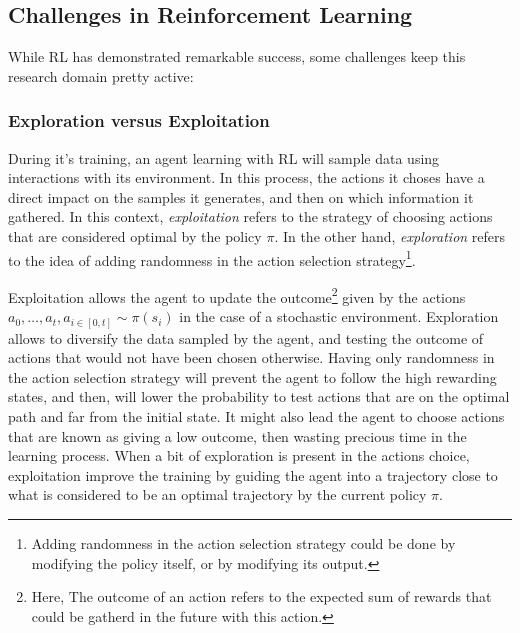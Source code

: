 \subsection{Challenges in Reinforcement Learning}\label{subsection:bg:rl:challenges-in-reinforcement-learning}

While RL has demonstrated remarkable success, some challenges keep this research domain pretty active:

\subsubsection{Exploration versus Exploitation}\label{subsubsection:bg:rl:prblems:exploration-exploitation}

During it's training, an agent learning with RL will sample data using interactions with its environment.
In this process, the actions it choses have a direct impact on the samples it generates, and then on which information
it gathered. %
In this context, \emph{exploitation} refers to the strategy of choosing actions that are considered optimal by the policy $\pi$.
In the other hand, \emph{exploration} refers to the idea of adding randomness in the action selection %
strategy\footnote{Adding
randomness in the action selection strategy could be done by modifying the policy itself, or by modifying its output.}. %

Exploitation allows the agent to update the outcome\footnote{Here, The outcome of an action refers to the expected sum
of rewards that could be gatherd in the future with this action.} given by the actions
${a_0, \dots, a_t}, a_{i \in [0, t]}\sim\pi(s_i)$ in the case of a stochastic environment. %
Exploration allows to diversify the data sampled by the agent, and testing the outcome of actions that would not have
been chosen otherwise.
Having only randomness in the action selection strategy will prevent the agent to follow the high rewarding states, and
then, will lower the probability to test actions that are on the optimal path and far from the initial state.
It might also lead the agent to choose actions that are known as giving a low outcome, then wasting precious time in
the learning process.
When a bit of exploration is present in the actions choice, exploitation improve the training by guiding the agent into
a trajectory close to what is considered to be an optimal trajectory by the current policy $\pi$. %

